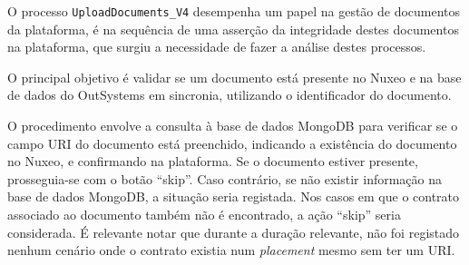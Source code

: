             O processo \texttt{UploadDocuments\_V4} desempenha um papel na gestão de documentos da plataforma, é na sequência de uma asserção da integridade destes documentos na plataforma, que surgiu a necessidade de fazer a análise destes processos. 
            
            O principal objetivo é validar se um documento está presente no Nuxeo e na base de dados do OutSystems em sincronia, utilizando o identificador do documento.

            O procedimento envolve a consulta à base de dados MongoDB para verificar se o campo URI do documento está preenchido, indicando a existência do documento no Nuxeo, e confirmando na plataforma. Se o documento estiver presente, prosseguia-se com o botão ``skip''. Caso contrário, se não existir informação na base de dados MongoDB, a situação seria registada. Nos casos em que o contrato associado ao documento também não é encontrado, a ação ``skip'' seria considerada. É relevante notar que durante a duração relevante, não foi registado nenhum cenário onde o contrato existia num \textit{placement} mesmo sem ter um URI.


        